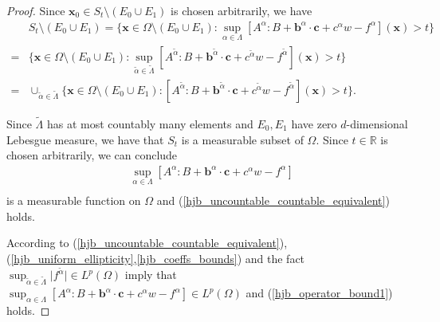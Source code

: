 \documentclass[12pt]{amsart}
\newcommand{\boldx}{\boldsymbol{x}}
\theoremstyle{definition}
\theoremstyle{remark}
\begin{document}
\begin{proof}
Since $\boldx_{0} \in S_{t} \setminus (E_{0}\cup E_{1})$ is chosen 
arbitrarily, we have 
\begin{align*}
& S_{t}\setminus (E_{0} \cup E_{1}) = 
\{ \boldx \in \Omega \setminus (E_{0}\cup E_{1}): \sup_{\alpha \in \Lambda} 
[A^{\alpha}:B + \boldsymbol{b}^{\alpha}\cdot \boldsymbol{c} 
+ c^{\alpha}w - f^{\alpha}](\boldx) > t \} \\
= & \{ \boldx \in \Omega \setminus (E_{0}\cup E_{1}): \sup_{\tilde{\alpha} \in 
\tilde{\Lambda}} [A^{\tilde{\alpha}}:B 
+ \boldsymbol{b}^{\tilde{\alpha}}\cdot \boldsymbol{c} 
+ c^{\tilde{\alpha}}w - f^{\tilde{\alpha}}]
(\boldx) > t \} \\
= & \cup_{\tilde{\alpha}\in \tilde{\Lambda}} 
\{\boldsymbol{x}\in \Omega \setminus (E_{0}\cup E_{1}): 
[A^{\tilde{\alpha}}:B 
+ \boldsymbol{b}^{\tilde{\alpha}}\cdot \boldsymbol{c} 
+ c^{\tilde{\alpha}}w - f^{\tilde{\alpha}}]
(\boldx) > t \}.
\end{align*}

Since $\tilde{\Lambda}$ has at most countably many elements and 
$E_{0},E_{1}$ have zero $d$-dimensional Lebesgue measure, we have that 
$S_{t}$ is a measurable subset of $\Omega$. Since $t\in \mathbb{R}$ 
is chosen arbitrarily, we can conclude 
\begin{align*}
& \sup_{\alpha \in \Lambda} [A^{\alpha}:B 
+ \boldsymbol{b}^{\alpha}\cdot \boldsymbol{c} + c^{\alpha}w - f^{\alpha}] \\
\end{align*}
is a measurable function on $\Omega$ and 
(\ref{hjb_uncountable_countable_equivalent}) holds.

According to (\ref{hjb_uncountable_countable_equivalent}), (\ref{hjb_uniform_ellipticity},\ref{hjb_coeffs_bounds}) 
and the fact $\sup_{\tilde{\alpha} 
\in \tilde{\Lambda}}\vert f^{\tilde{\alpha}}\vert \in L^{p}(\Omega)$
imply that $\sup_{\alpha \in \Lambda} [A^{\alpha}:B 
+ \boldsymbol{b}^{\alpha}\cdot \boldsymbol{c} 
+ c^{\alpha}w - f^{\alpha}]\in L^{p}(\Omega)$ 
and (\ref{hjb_operator_bound1}) holds.
\end{proof}
\end{document}
